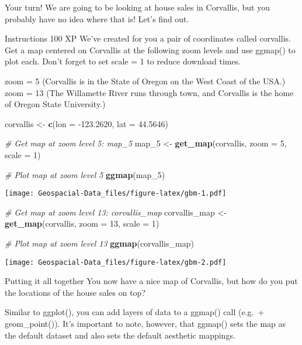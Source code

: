 \documentclass[]{article}
\newenvironment{Shaded}{\begin{snugshade}}{\end{snugshade}}
\newcommand{\CommentTok}[1]{\textcolor[rgb]{0.56,0.35,0.01}{\textit{#1}}}
\newcommand{\DataTypeTok}[1]{\textcolor[rgb]{0.13,0.29,0.53}{#1}}
\newcommand{\DecValTok}[1]{\textcolor[rgb]{0.00,0.00,0.81}{#1}}
\newcommand{\FloatTok}[1]{\textcolor[rgb]{0.00,0.00,0.81}{#1}}
\newcommand{\KeywordTok}[1]{\textcolor[rgb]{0.13,0.29,0.53}{\textbf{#1}}}
\newcommand{\NormalTok}[1]{#1}
\newcommand{\StringTok}[1]{\textcolor[rgb]{0.31,0.60,0.02}{#1}}
\begin{document}
Your turn! We are going to be looking at house sales in Corvallis, but
you probably have no idea where that is! Let's find out.

Instructions 100 XP We've created for you a pair of coordinates called
corvallis. Get a map centered on Corvallis at the following zoom levels
and use ggmap() to plot each. Don't forget to set scale = 1 to reduce
download times.

zoom = 5 (Corvallis is in the State of Oregon on the West Coast of the
USA.) zoom = 13 (The Willamette River runs through town, and Corvallis
is the home of Oregon State University.)

\begin{Shaded}
\begin{Highlighting}[]
\NormalTok{corvallis <-}\StringTok{ }\KeywordTok{c}\NormalTok{(}\DataTypeTok{lon =} \FloatTok{-123.2620}\NormalTok{, }\DataTypeTok{lat =} \FloatTok{44.5646}\NormalTok{)}

\CommentTok{# Get map at zoom level 5: map_5}
\NormalTok{map_}\DecValTok{5}\NormalTok{ <-}\StringTok{ }\KeywordTok{get_map}\NormalTok{(corvallis, }\DataTypeTok{zoom =} \DecValTok{5}\NormalTok{, }\DataTypeTok{scale =} \DecValTok{1}\NormalTok{)}

\CommentTok{# Plot map at zoom level 5}
\KeywordTok{ggmap}\NormalTok{(map_}\DecValTok{5}\NormalTok{)}
\end{Highlighting}
\end{Shaded}

\texttt{[image: Geospacial-Data\_files/figure-latex/gbm-1.pdf]}

\begin{Shaded}
\begin{Highlighting}[]
\CommentTok{# Get map at zoom level 13: corvallis_map}
\NormalTok{corvallis_map <-}\StringTok{ }\KeywordTok{get_map}\NormalTok{(corvallis, }\DataTypeTok{zoom =} \DecValTok{13}\NormalTok{, }\DataTypeTok{scale =} \DecValTok{1}\NormalTok{)}

\CommentTok{# Plot map at zoom level 13}
\KeywordTok{ggmap}\NormalTok{(corvallis_map)}
\end{Highlighting}
\end{Shaded}

\texttt{[image: Geospacial-Data\_files/figure-latex/gbm-2.pdf]}

Putting it all together You now have a nice map of Corvallis, but how do
you put the locations of the house sales on top?

Similar to ggplot(), you can add layers of data to a ggmap() call
(e.g.~+ geom\_point()). It's important to note, however, that ggmap()
sets the map as the default dataset and also sets the default aesthetic
mappings.
\end{document}
